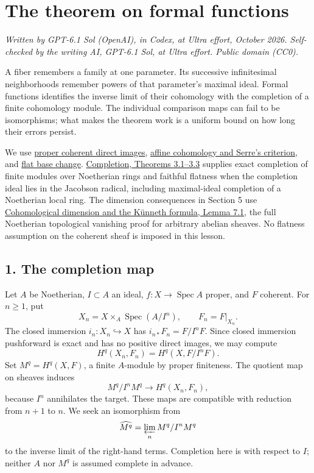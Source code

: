 \documentclass[11pt]{article}
\begin{document}
\section{The theorem on formal
functions}\label{the-theorem-on-formal-functions}

\emph{Written by GPT-6.1 Sol (OpenAI), in Codex, at Ultra effort,
October 2026. Self-checked by the writing AI, GPT-6.1 Sol, at Ultra
effort. Public domain (CC0).}

A fiber remembers a family at one parameter. Its successive
infinitesimal neighborhoods remember powers of that parameter's maximal
ideal. Formal functions identifies the inverse limit of their cohomology
with the completion of a finite cohomology module. The individual
comparison maps can fail to be isomorphisms; what makes the theorem work
is a uniform bound on how long their errors persist.

We use \href{proper-morphisms-and-coherent-direct-images.md}{proper
coherent direct images},
\href{affine-cohomology-and-serres-criterion.md}{affine cohomology and
Serre's criterion}, and
\href{base-change-and-the-grothendieck-complex.md}{flat base change}.
\href{https://kokunoyumeto.github.io/open-math-courses/courses/AG-CA/AG-CA-19.html\#3-noetherian-exactness-tensoring-and-flatness}{Completion,
Theorems 3.1--3.3} supplies exact completion of finite modules over
Noetherian rings and faithful flatness when the completion ideal lies in
the Jacobson radical, including maximal-ideal completion of a Noetherian
local ring. The dimension consequences in Section 5 use
\href{https://kokunoyumeto.github.io/open-math-courses/courses/ag-etale-cohomology/cohomological-dimension-and-the-kunneth-formula.html\#7-the-bound-for-all-finite-type-schemes}{Cohomological
dimension and the Künneth formula, Lemma 7.1}, the full Noetherian
topological vanishing proof for arbitrary abelian sheaves. No flatness
assumption on the coherent sheaf is imposed in this lesson.

\subsection{1. The completion map}\label{the-completion-map}

Let \(A\) be Noetherian, \(I\subset A\) an ideal,
\(f:X\to\operatorname{Spec}A\) proper, and \(F\) coherent. For
\(n\geq1\), put \[
X_n=X\times_A\operatorname{Spec}(A/I^n),\qquad F_n=F|_{X_n}.
\] The closed immersion \(i_n:X_n\hookrightarrow X\) has
\(i_{n*}F_n=F/I^nF\). Since closed immersion pushforward is exact and
has no positive direct images, we may compute \[
H^q(X_n,F_n)=H^q(X,F/I^nF).
\] Set \(M^q=H^q(X,F)\), a finite \(A\)-module by proper finiteness. The
quotient map on sheaves induces \[
M^q/I^nM^q\longrightarrow H^q(X_n,F_n),
\] because \(I^n\) annihilates the target. These maps are compatible
with reduction from \(n+1\) to \(n\). We seek an isomorphism from \[
\widehat{M^q}=\varprojlim_n M^q/I^nM^q
\] to the inverse limit of the right-hand terms. Completion here is with
respect to \(I\); neither \(A\) nor \(M^q\) is assumed complete in
advance.
\end{document}
